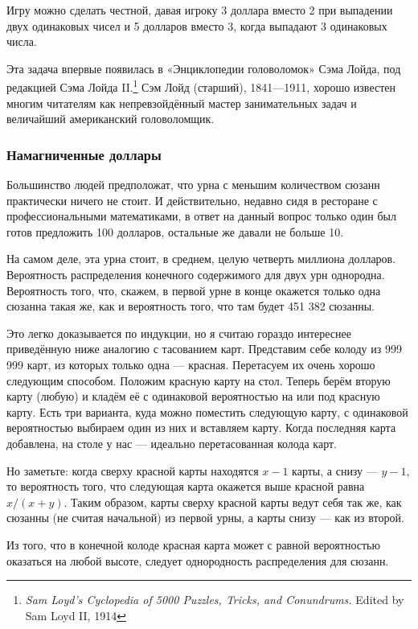 \medskip

Игру можно сделать честной, давая игроку 3 доллара вместо 2 при выпадении двух одинаковых чисел 
и 5 долларов вместо 3, когда выпадают 3 одинаковых числа.

\medskip

Эта задача впервые появилась в «Энциклопедии головоломок» Сэма Лойда, под редакцией Сэма Лойда II.\footnote{\emph{Sam Loyd’s Cyclopedia of 5000 Puzzles, Tricks, and Conundrums.} Edited by Sam Loyd II, 1914}
Сэм Лойд (старший), 1841---1911, хорошо известен многим читателям как непревзойдённый мастер занимательных задач и величайший американский головоломщик.

\subsubsection*{Намагниченные доллары}%

Большинство людей предположат, что урна с меньшим количеством сюзанн практически ничего не стоит.
И действительно, недавно сидя в ресторане с профессиональными математиками, в ответ на данный вопрос только один был готов предложить 100 долларов, остальные же давали не больше 10.

На самом деле, эта урна стоит, в среднем, целую четверть миллиона долларов.
Вероятность распределения конечного содержимого для двух урн однородна.
Вероятность того, что, скажем, в первой урне в конце окажется только одна сюзанна такая же, как и вероятность того, что там будет 451 382 сюзанны.

Это легко доказывается по индукции, но я считаю гораздо интереснее приведённую ниже аналогию с тасованием карт.
Представим себе колоду из 
999 999 
карт, из которых только одна --- красная.
Перетасуем их очень хорошо следующим способом.
Положим красную карту на стол.
Теперь берём вторую карту (любую) и кладём её с одинаковой вероятностью на или под красную карту.
Есть три варианта, куда можно поместить следующую карту, с одинаковой вероятностью выбираем один из них и вставляем карту.
Когда последняя карта добавлена, на столе у нас --- идеально перетасованная колода карт.

Но заметьте: когда сверху красной карты находятся $x-1$ карты, а снизу --- $y-1$, то вероятность того, что следующая карта окажется выше красной равна $x/(x+y)$.
Таким образом, карты сверху красной карты ведут себя так же, как сюзанны (не считая начальной) из первой урны, а карты снизу --- как из второй.

Из того, что в конечной колоде красная карта может с равной вероятностью оказаться на любой высоте, следует однородность распределения для сюзанн.\heart
 
